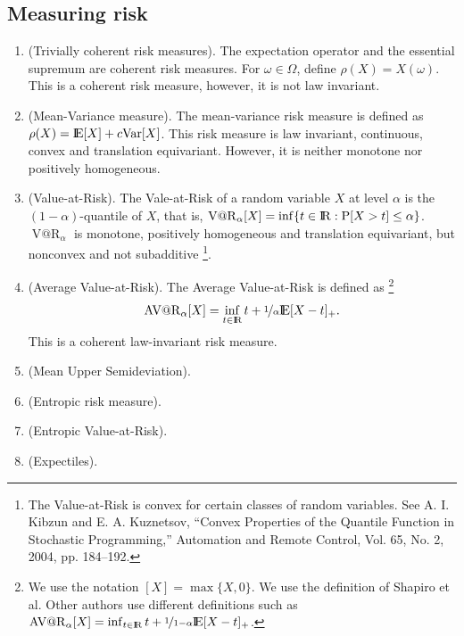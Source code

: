 \documentclass[a4paper,10pt]{article}
\begin{document}
\subsection{Measuring risk}
\begin{enumerate}
 \item (Trivially coherent risk measures). The expectation operator and the essential supremum are 
       coherent risk measures. For $\omega\in\Omega$, define $\rho(X) = X(\omega)$. This is a coherent
       risk measure, however, it is not law invariant.
 \item (Mean-Variance measure).  The mean-variance risk measure is defined as $\rho(X) = \E[X] + c \mathrm{Var}[X]$.
       This risk measure is law invariant, continuous, convex and translation equivariant. 
       However, it is neither monotone nor positively homogeneous.
 \item (Value-at-Risk). The Vale-at-Risk of a random variable $X$ at level $\alpha$ is the $(1-\alpha)$-quantile of $X$,
       that is, $\operatorname{V@R}_\alpha[X] = \inf\{t\in\Re: \prob[X>t]\leq \alpha\}$. $\operatorname{V@R}_\alpha$ 
       is monotone, positively homogeneous and translation equivariant, but nonconvex and not subadditive%
	  \footnote{The Value-at-Risk is convex for certain classes of random variables. See A. I. Kibzun and E. A. Kuznetsov, ``Convex Properties of the Quantile Function in Stochastic Programming,'' Automation and Remote Control, Vol. 65, No. 2, 2004, pp. 184--192.}.
 \item (Average Value-at-Risk). The Average Value-at-Risk is defined as%
	  \footnote{We use the notation $[X]=\max\{X,0\}$. We use the definition of Shapiro et al. Other authors
	            use different definitions such as $\operatorname{AV@R}_\alpha[X] = \inf_{t\in\Re}t + \nicefrac{1}{1-\alpha}\E[X-t]_+$.}
       \[
          \operatorname{AV@R}_\alpha[X] = \inf_{t\in\Re}t + \nicefrac{1}{\alpha}\E[X-t]_+.
       \]
       This is a coherent law-invariant risk measure.
 \item (Mean Upper Semideviation).
 \item (Entropic risk measure).
 \item (Entropic Value-at-Risk).
 \item (Expectiles).
\end{enumerate}
\end{document}
